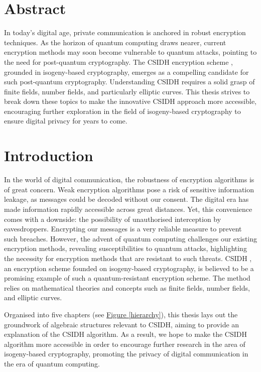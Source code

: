 \documentclass[openany, a4paper, 10pt]{book}
\theoremstyle{plain}
\theoremstyle{plain}
\theoremstyle{plain}
\theoremstyle{definition}
\theoremstyle{plain}
\theoremstyle{definition}
\theoremstyle{remark}
\newcommand{\figref}[1]{\hyperref[#1]{Figure \ref{#1}}}
\begin{document}
\chapter*{Abstract}
In today's digital age, private communication is anchored in robust encryption techniques.
As the horizon of quantum computing draws nearer, current encryption methods may soon become vulnerable to quantum attacks, pointing to the need for post-quantum cryptography.
The CSIDH encryption scheme \cite{CSIDH}, grounded in isogeny-based cryptography, emerges as a compelling candidate for such post-quantum cryptography.
Understanding CSIDH requires a solid grasp of finite fields, number fields, and particularly elliptic curves.
This thesis strives to break down these topics to make the innovative CSIDH approach more accessible, encouraging further exploration in the field of isogeny-based cryptography to ensure digital privacy for years to come.


\chapter*{Introduction}
In the world of digital communication, the robustness of encryption algorithms is of great concern.
Weak encryption algorithms pose a risk of sensitive information leakage, as messages could be decoded without our consent.
The digital era has made information rapidly accessible across great distances.
Yet, this convenience comes with a downside: the possibility of unauthorised interception by eavesdroppers.
Encrypting our messages is a very reliable measure to prevent such breaches.
However, the advent of quantum computing challenges our existing encryption methods, revealing susceptibilities to quantum attacks, highlighting the necessity for encryption methods that are resistant to such threats.
CSIDH \cite{CSIDH}, an encryption scheme founded on isogeny-based cryptography, is believed to be a promising example of such a quantum-resistant encryption scheme.
The method relies on mathematical theories and concepts such as finite fields, number fields, and elliptic curves.

Organised into five chapters (see \figref{hierarchy}), this thesis lays out the groundwork of algebraic structures relevant to CSIDH, aiming to provide an explanation of the CSIDH algorithm.
As a result, we hope to make the CSIDH algorithm more accessible in order to encourage further research in the area of isogeny-based cryptography, promoting the privacy of digital communication in the era of quantum computing.
\end{document}
